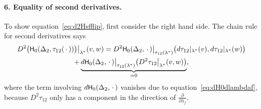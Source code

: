 \documentclass[a4paper, 11pt]{article}
\newcommand{\Hsf}{\scalebox{0.94}{$\mathsf{H}$}}
\theoremstyle{plain}
\theoremstyle{definition}
\begin{document}
\paragraph{6. Equality of second derivatives.} To show
equation~\eqref{eq:d2Hsfflip}, first consider the right hand
side. The chain rule for second derivatives says
\begin{multline}
    D^{2}\big(\Hsf_{0}(\Delta_{2},\tau_{12}(\,\cdot\,))\big)
    \big|_{\lambda^{*}}(v,w)=
    D^{2}\Hsf_{0}(\Delta_{2},\,\cdot\,)\big|_{\tau_{12}(\lambda^{*})}
    \big(d\tau_{12}|_{\lambda^{*}}(v),d\tau_{12}|_{\lambda^{*}}(w)\big)\\
    + \underbrace{d\Hsf_{0}(\Delta_{2},\,\cdot\,)\big|_{\tau_{12}(\lambda^{*})}
    \big(D^{2}\tau_{12}\big|_{\lambda^{*}}(v,w)\big)}_{=0},
\end{multline}
where the term involving $d\Hsf_{0}(\Delta_{2},\,\cdot\,)$ vanishes due to
equation~\eqref{eq:dH0dlambdaf}, because $D^{2}\tau_{12}$ only has a component in the direction of
$\tfrac{\partial}{\partial\lambda_{f}}$.
\end{document}
